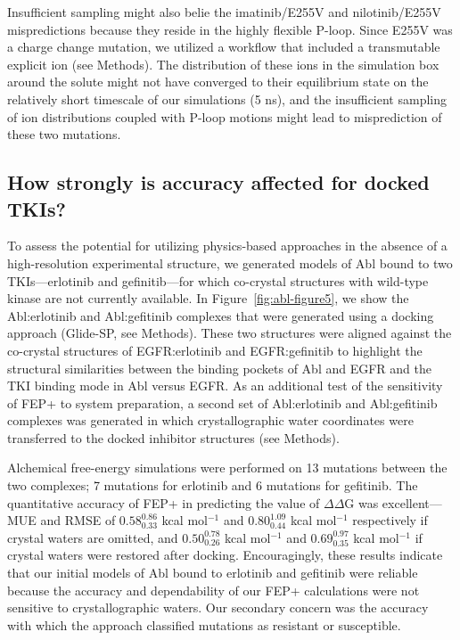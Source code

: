 \documentclass[phd,tocprelim]{cornell}
\begin{document}
Insufficient sampling might also belie the imatinib/E255V and nilotinib/E255V mispredictions because they reside in the highly flexible P-loop.
Since E255V was a charge change mutation, we utilized a workflow that included a transmutable explicit ion (see Methods).
The distribution of these ions in the simulation box around the solute might not have converged to their equilibrium state on the relatively short timescale of our simulations (5 ns), and the insufficient sampling of ion distributions coupled with P-loop motions might lead to misprediction of these two mutations.

\subsection{How strongly is accuracy affected for docked TKIs?}
To assess the potential for utilizing physics-based approaches in the absence of a high-resolution experimental structure, we generated models of Abl bound to two TKIs---erlotinib and gefinitib---for which co-crystal structures with wild-type kinase are not currently available.
In Figure~\ref{fig:abl-figure5}, we show the Abl:erlotinib and Abl:gefitinib complexes that were generated using a docking approach (Glide-SP, see Methods). 
These two structures were aligned against the co-crystal structures of EGFR:erlotinib and EGFR:gefinitib to highlight the structural similarities between the binding pockets of Abl and EGFR and the TKI binding mode in Abl versus EGFR.
As an additional test of the sensitivity of FEP+ to system preparation, a second set of Abl:erlotinib and Abl:gefitinib complexes was generated in which crystallographic water coordinates were transferred to the docked inhibitor structures (see Methods).

Alchemical free-energy simulations were performed on 13 mutations between the two complexes; 7 mutations for erlotinib and 6 mutations for gefitinib.
The quantitative accuracy of FEP+ in predicting the value of $\Delta \Delta$G was excellent---MUE and RMSE of $0.58^{0.86}_{0.33}$ kcal mol$^{-1}$ and $0.80^{1.09}_{0.44}$ kcal mol$^{-1}$ respectively if crystal waters are omitted, and $0.50^{0.78}_{0.26}$ kcal mol$^{-1}$ and $0.69^{0.97}_{0.35}$ kcal mol$^{-1}$ if crystal waters were restored after docking.
Encouragingly, these results indicate that our initial models of Abl bound to erlotinib and gefitinib were reliable because the accuracy and dependability of our FEP+ calculations were not sensitive to crystallographic waters.
Our secondary concern was the accuracy with which the approach classified mutations as resistant or susceptible.
\end{document}
